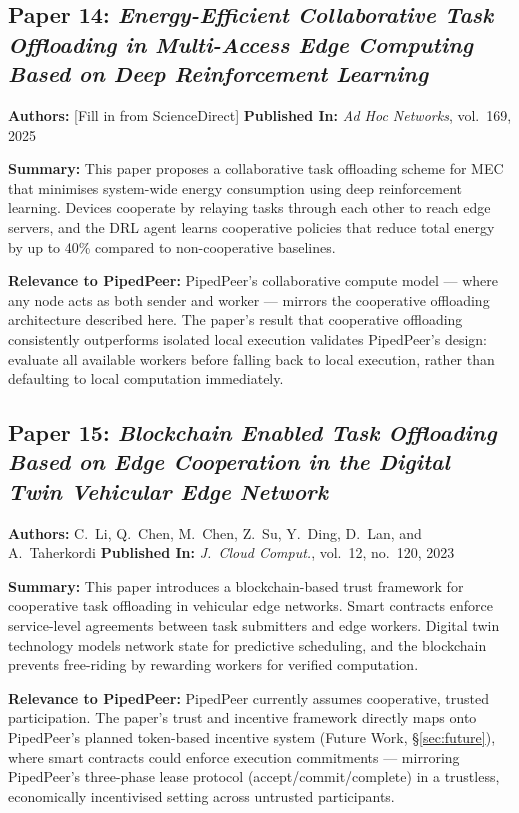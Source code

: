 \subsection*{Paper 14: \textit{Energy-Efficient Collaborative Task Offloading in
Multi-Access Edge Computing Based on Deep Reinforcement Learning}}
\textbf{Authors:} [Fill in from ScienceDirect] \quad
\textbf{Published In:} \textit{Ad Hoc Networks}, vol.~169, 2025~\cite{anon2025energy}

\noindent\textbf{Summary:}
This paper proposes a collaborative task offloading scheme for MEC that minimises
system-wide energy consumption using deep reinforcement learning. Devices cooperate
by relaying tasks through each other to reach edge servers, and the DRL agent learns
cooperative policies that reduce total energy by up to 40\% compared to non-cooperative
baselines.

\noindent\textbf{Relevance to PipedPeer:}
PipedPeer's collaborative compute model — where any node acts as both sender and
worker — mirrors the cooperative offloading architecture described here. The paper's
result that cooperative offloading consistently outperforms isolated local execution
validates PipedPeer's design: evaluate all available workers before falling back to
local execution, rather than defaulting to local computation immediately.

\subsection*{Paper 15: \textit{Blockchain Enabled Task Offloading Based on Edge
Cooperation in the Digital Twin Vehicular Edge Network}}
\textbf{Authors:} C.~Li, Q.~Chen, M.~Chen, Z.~Su, Y.~Ding, D.~Lan, and
A.~Taherkordi \quad
\textbf{Published In:} \textit{J.\ Cloud Comput.}, vol.~12, no.~120, 2023~\cite{li2023blockchain}

\noindent\textbf{Summary:}
This paper introduces a blockchain-based trust framework for cooperative task
offloading in vehicular edge networks. Smart contracts enforce service-level
agreements between task submitters and edge workers. Digital twin technology models
network state for predictive scheduling, and the blockchain prevents free-riding by
rewarding workers for verified computation.

\noindent\textbf{Relevance to PipedPeer:}
PipedPeer currently assumes cooperative, trusted participation. The paper's
trust and incentive framework directly maps onto PipedPeer's planned token-based
incentive system (Future Work, \S\ref{sec:future}), where smart contracts could
enforce execution commitments — mirroring PipedPeer's three-phase lease protocol
(accept/commit/complete) in a trustless, economically incentivised setting across
untrusted participants.

